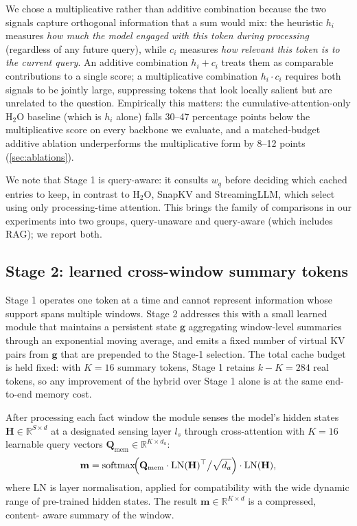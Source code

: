 We chose a multiplicative rather than additive combination because the
two signals capture orthogonal information that a sum would mix: the
heuristic $h_i$ measures \emph{how much the model engaged with this token
during processing} (regardless of any future query), while $c_i$
measures \emph{how relevant this token is to the current query}. An
additive combination $h_i + c_i$ treats them as comparable contributions
to a single score; a multiplicative combination $h_i \cdot c_i$ requires
both signals to be jointly large, suppressing tokens that look
locally salient but are unrelated to the question. Empirically this
matters: the cumulative-attention-only H${}_2$O baseline (which is
$h_i$ alone) falls 30--47 percentage points below the multiplicative
score on every backbone we evaluate, and a matched-budget additive
ablation underperforms the multiplicative form by 8--12 points
(\cref{sec:ablations}).

We note that Stage 1 is query-aware: it consults $w_q$ before deciding
which cached entries to keep, in contrast to H${}_2$O, SnapKV and
StreamingLLM, which select using only processing-time attention. This
brings the family of comparisons in our experiments into two groups,
query-unaware and query-aware (which includes RAG); we report both.


\subsection{Stage 2: learned cross-window summary tokens}\label{sec:s2}

Stage 1 operates one token at a time and cannot represent information
whose support spans multiple windows. Stage 2 addresses this with a
small learned module that maintains a persistent state $\mathbf{g}$
aggregating window-level summaries through an exponential moving
average, and emits a fixed number of virtual KV pairs from $\mathbf{g}$
that are prepended to the Stage-1 selection. The total cache budget is
held fixed: with $K=16$ summary tokens, Stage 1 retains $k-K=284$ real
tokens, so any improvement of the hybrid over Stage 1 alone is at the
same end-to-end memory cost.

After processing each fact window the module senses the model's
hidden states $\mathbf{H}\in\mathbb{R}^{S\times d}$ at a designated
sensing layer $l_s$ through cross-attention with $K=16$ learnable query
vectors $\mathbf{Q}_{\mathrm{mem}}\in\mathbb{R}^{K\times d_a}$:
\begin{equation}
    \mathbf{m} = \mathrm{softmax}\!\Bigl(
        \mathbf{Q}_{\mathrm{mem}}\cdot\mathrm{LN}(\mathbf{H})^\top
        \big/\sqrt{d_a}\Bigr)\cdot\mathrm{LN}(\mathbf{H}),
    \label{eq:sense}
\end{equation}
where $\mathrm{LN}$ is layer normalisation, applied for compatibility
with the wide dynamic range of pre-trained hidden states. The
result $\mathbf{m}\in\mathbb{R}^{K\times d}$ is a compressed, content-
aware summary of the window.

